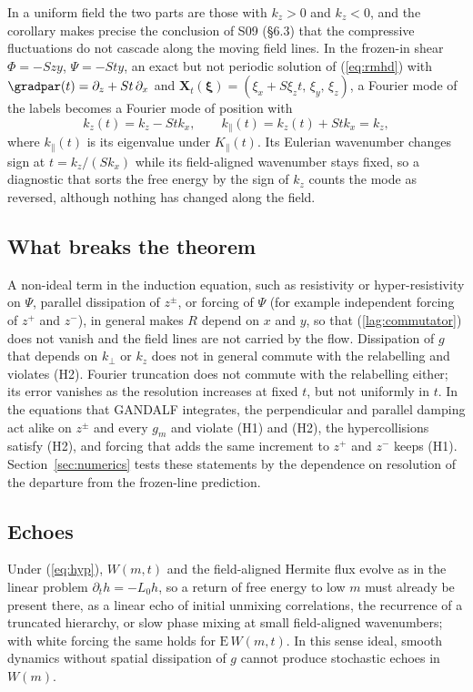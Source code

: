 In a uniform field the two parts are those with $k_z>0$ and $k_z<0$, and the corollary makes precise the conclusion of S09 (\S6.3) that the compressive fluctuations do not cascade along the moving field lines. In the frozen-in shear $\Phi=-Szy$, $\Psi=-Sty$, an exact but not periodic solution of (\ref{eq:rmhd}) with $\gradpar(t)=\partial_z+St\,\partial_x$ and $\boldsymbol X_t(\boldsymbol\xi)=(\xi_x+S\xi_zt,\,\xi_y,\,\xi_z)$, a Fourier mode of the labels becomes a Fourier mode of position with
\begin{equation}\label{lag:shear}
  k_z(t)=k_z-Stk_x,\qquad k_\parallel(t)=k_z(t)+Stk_x=k_z ,
\end{equation}
where $k_\parallel(t)$ is its eigenvalue under $K_\parallel(t)$. Its Eulerian wavenumber changes sign at $t=k_z/(Sk_x)$ while its field-aligned wavenumber stays fixed, so a diagnostic that sorts the free energy by the sign of $k_z$ counts the mode as reversed, although nothing has changed along the field.

\subsection{What breaks the theorem}

A non-ideal term in the induction equation, such as resistivity or hyper-resistivity on $\Psi$, parallel dissipation of $z^\pm$, or forcing of $\Psi$ (for example independent forcing of $z^+$ and $z^-$), in general makes $R$ depend on $x$ and $y$, so that (\ref{lag:commutator}) does not vanish and the field lines are not carried by the flow. Dissipation of $g$ that depends on $k_\perp$ or $k_z$ does not in general commute with the relabelling and violates (H2). Fourier truncation does not commute with the relabelling either; its error vanishes as the resolution increases at fixed $t$, but not uniformly in $t$. In the equations that GANDALF integrates, the perpendicular and parallel damping act alike on $z^\pm$ and every $g_m$ and violate (H1) and (H2), the hypercollisions satisfy (H2), and forcing that adds the same increment to $z^+$ and $z^-$ keeps (H1). Section~\ref{sec:numerics} tests these statements by the dependence on resolution of the departure from the frozen-line prediction.

\subsection{Echoes}

Under (\ref{eq:hyp}), $W(m,t)$ and the field-aligned Hermite flux evolve as in the linear problem $\partial_th=-L_0h$, so a return of free energy to low $m$ must already be present there, as a linear echo of initial unmixing correlations, the recurrence of a truncated hierarchy, or slow phase mixing at small field-aligned wavenumbers; with white forcing the same holds for $\mathrm E\,W(m,t)$. In this sense ideal, smooth dynamics without spatial dissipation of $g$ cannot produce stochastic echoes in $W(m)$.


